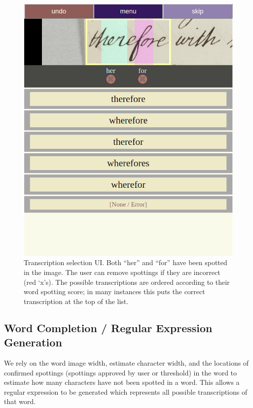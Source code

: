 \documentclass[ms,electronic,twosidetoc,letterpaper,chaptercenter,parttop,lof,lot]{byumsphd}
\begin{document}
\begin{figure}
    \centering
    \includegraphics[width=.75\textwidth]{transcriptionselection}
    \caption{Transcription selection UI.  Both ``her'' and ``for'' have been spotted in the image. The user can remove spottings if they are incorrect (red `x's). The possible transcriptions are ordered according to their word spotting score; in many instances this puts the correct transcription at the top of the list.
    }
    \label{fig:transcriptionselection}
\end{figure}




\subsection{Word Completion / Regular Expression Generation}\label{wordcompletion}
We rely on the word image width, estimate character width, and the locations of confirmed spottings (spottings approved by user or threshold) in the word to estimate how many characters have not been spotted in a word. This allows a regular expression to be generated which represents all possible transcriptions of that word.
\end{document}
